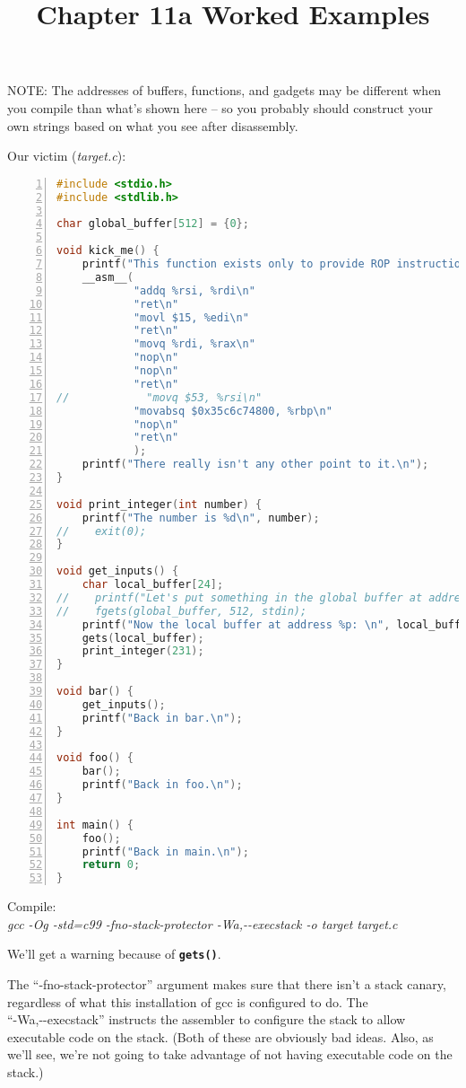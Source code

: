 \documentclass{article}
\newcommand{\function}[1]{\textbf{\lstinline{#1}}}
\begin{document}
\title{Chapter 11a Worked Examples}
\date{}
\maketitle

NOTE: The addresses of buffers, functions, and gadgets may be different when you compile than what's shown here -- so you probably should construct your own strings based on what you see after disassembly.

Our victim (\textit{target.c}):

\begin{lstlisting}[language=C, numbers=left]
#include <stdio.h>
#include <stdlib.h>

char global_buffer[512] = {0};

void kick_me() {
    printf("This function exists only to provide ROP instructions.\n");
    __asm__(
            "addq %rsi, %rdi\n"
            "ret\n"
            "movl $15, %edi\n"
            "ret\n"
            "movq %rdi, %rax\n"
            "nop\n"
            "nop\n"
            "ret\n"
//            "movq $53, %rsi\n"
            "movabsq $0x35c6c74800, %rbp\n"
            "nop\n"
            "ret\n"
            );
    printf("There really isn't any other point to it.\n");
}

void print_integer(int number) {
    printf("The number is %d\n", number);
//    exit(0);
}

void get_inputs() {
    char local_buffer[24];
//    printf("Let's put something in the global buffer at address %p: \n", global_buffer);
//    fgets(global_buffer, 512, stdin);
    printf("Now the local buffer at address %p: \n", local_buffer);
    gets(local_buffer);
    print_integer(231);
}

void bar() {
    get_inputs();
    printf("Back in bar.\n");
}

void foo() {
    bar();
    printf("Back in foo.\n");
}

int main() {
    foo();
    printf("Back in main.\n");
    return 0;
}
\end{lstlisting}

Compile: \\ \textit{gcc -Og -std=c99 -fno-stack-protector -Wa,-\hspace{1pt}-execstack -o target target.c}

We'll get a warning because of \function{gets()}.

The ``-fno-stack-protector'' argument makes sure that there isn't a stack canary, regardless of what this installation of gcc is configured to do.
The \\ ``-Wa,-\hspace{1pt}-execstack'' instructs the assembler to configure the stack to allow executable code on the stack.
(Both of these are obviously bad ideas.
Also, as we'll see, we're not going to take advantage of not having executable code on the stack.)
\end{document}
